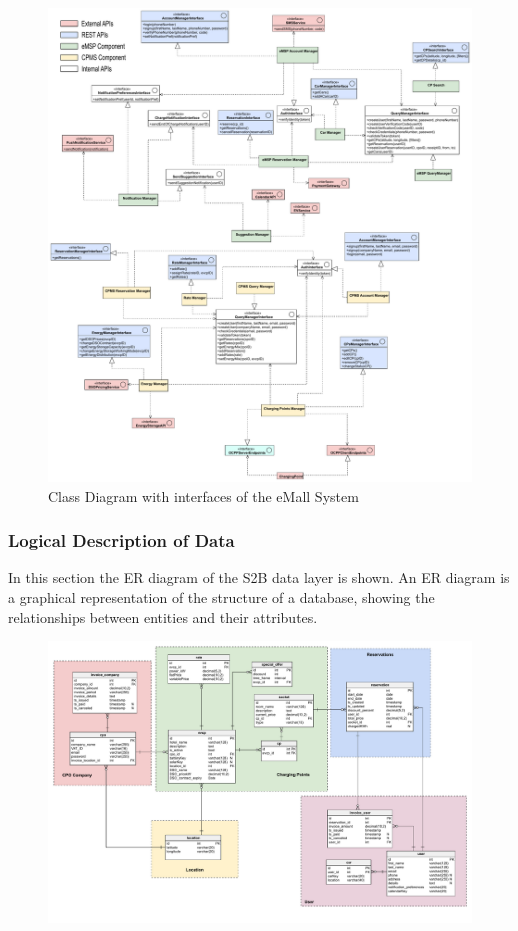 \begin{figure}[H]
    \centering
    \hspace*{-2.5cm}
    \includegraphics[height=\textheight-1.5cm,keepaspectratio]{src/componentInterfaces/component_interface.pdf}
    \caption{Class Diagram with interfaces of the eMall System}
\end{figure}


\subsubsection{Logical Description of Data}
In this section the ER diagram of the S2B data layer is shown. An ER diagram is a graphical representation of the structure of a database, showing the relationships between entities and their attributes.
\begin{figure}[H]
    \includegraphics[scale=0.42]{src/ERDiagram/er_diagram.pdf}
\end{figure}

